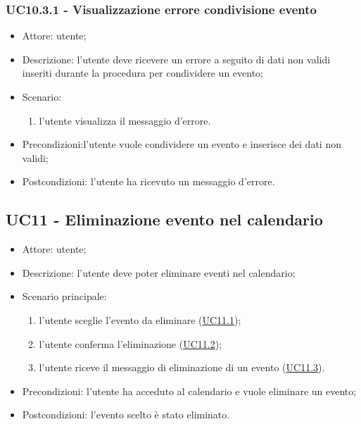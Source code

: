 \subsubsection{UC10.3.1 - Visualizzazione errore condivisione evento} \label{sec: UC10.3.1}
\begin{itemize}
    \item Attore: utente;
    \item Descrizione: l'utente deve ricevere un errore a seguito di dati non validi inseriti durante la procedura per condividere un evento;
    \item Scenario:
        \begin{enumerate}
        \item l'utente visualizza il messaggio d'errore.
        \end{enumerate}
    
    \item Precondizioni:l'utente vuole condividere un evento e inserisce dei dati non validi;
    \item Postcondizioni: l'utente ha ricevuto un messaggio d'errore.
\end{itemize}


\subsection{UC11 - Eliminazione evento nel calendario}
\begin{itemize}
    \item Attore: utente;
    \item Descrizione: l'utente deve poter eliminare eventi nel calendario;
    \item Scenario principale:
        \begin{enumerate}
        \item l'utente sceglie l'evento da eliminare (\hyperref[sec: UC11.1]{UC11.1});
        \item l'utente conferma l'eliminazione (\hyperref[sec: UC11.2]{UC11.2});
        \item l'utente riceve il messaggio di eliminazione di un evento (\hyperref[sec: UC11.3]{UC11.3}).
        \end{enumerate}
    \item Precondizioni: l'utente ha acceduto al calendario e vuole eliminare un evento;
    \item Postcondizioni: l'evento scelto è stato eliminato.
\end{itemize}

